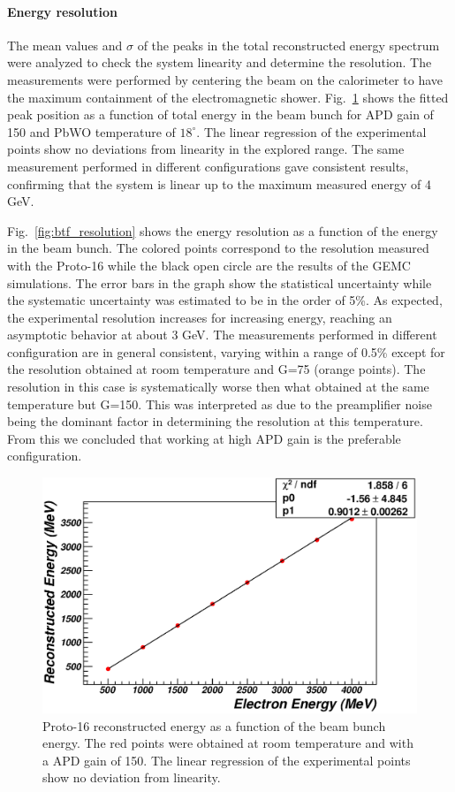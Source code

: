 \paragraph{Energy resolution}

The mean values and $\sigma$ of the peaks in the total reconstructed
energy spectrum were analyzed to check the system linearity and
determine the resolution. The measurements were performed by centering
the beam on the calorimeter to have the maximum containment of the
electromagnetic shower. 
Fig.~\ref{fig:btf_linearity} shows the fitted
peak position as a function of total energy in the beam bunch for APD
gain of 150 and PbWO temperature of $18^{\circ}$. The linear
regression of the experimental points show no deviations from
linearity in the explored range. The same measurement performed in
different configurations gave consistent results, confirming that the
system is linear up to the maximum measured energy of 4 GeV.

Fig.~\ref{fig:btf_resolution} shows the energy resolution as a
function of the energy in the beam bunch. The colored points
correspond to the resolution measured with the Proto-16 while the
black open circle are the results of the GEMC simulations. The error
bars in the graph show the statistical uncertainty while the
systematic uncertainty was estimated to be in the order of 5\%. 
As expected, the experimental resolution increases for increasing energy,
reaching an asymptotic behavior at about 3 GeV. The measurements
performed in different configuration are in general consistent,
varying within a range of 0.5\% except for the resolution obtained at
room temperature and G=75 (orange points).
The resolution in this case is systematically worse then what obtained
at the same temperature but G=150. This was interpreted as
due to the preamplifier noise being the dominant factor in determining
the resolution at this temperature. From this we concluded that
working at high APD gain is the preferable configuration. 
\begin{figure}
\includegraphics[width=1.0\columnwidth]{fig/btf_linearity_1876_2_6.eps}
\caption{Proto-16 reconstructed energy as a function of the beam bunch energy. The red points were obtained at room temperature and with a APD gain of 150. The linear regression of the experimental points show no deviation from linearity.}
\label{fig:btf_linearity}
\end{figure}

